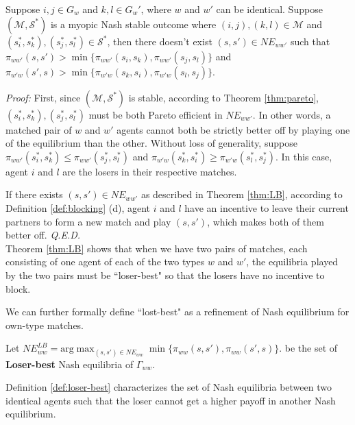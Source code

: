 \documentclass{myPaper}
\begin{document}
 \begin{theorem} \label{thm:LB}
Suppose $i, j\in G_w$ and $k, l \in G_w'$, where $w$ and $w'$ can be identical. Suppose $(\mathcal{M}, \mathcal{S}^*)$ is a myopic Nash stable outcome where $(i, j), (k, l) \in \mathcal{M}$ and $(s_i^*, s_k^*), (s_j^*, s_l^*) \in \mathcal{S}^*$, then there doesn't exist $(s, s')\in NE_{ww'}$ such that $\pi_{ww'}(s, s') > \min\{\pi_{ww'}(s_i, s_k), \pi_{ww'}(s_j, s_l)\}$ and $\pi_{w'w}(s', s) > \min\{\pi_{w'w}(s_k, s_i), \pi_{w'w}(s_l, s_j)\}$.
\end{theorem}
\noindent \textit{Proof:} First, since $(\mathcal{M}, \mathcal{S}^*)$ is stable, according to Theorem \ref{thm:pareto}, $(s_i^*, s_k^*), (s_j^*, s_l^*)$ must be both Pareto efficient in $NE_{ww'}$. In other words, a matched pair of $w$ and $w'$ agents cannot both be strictly better off by playing one of the equilibrium than the other.  Without loss of generality, suppose $\pi_{ww'}(s_i^*, s_k^*) \le \pi_{ww'}(s_j^*, s_l^*)$ and $\pi_{w'w}(s_k^*, s_i^*) \ge \pi_{w'w}(s_l^*, s_j^*)$. In this case, agent $i$ and $l$ are the losers in their respective matches. 

If there exists $(s, s') \in NE_{ww'}$ as described in Theorem \ref{thm:LB}, according to Definition \ref{def:blocking} (d), agent $i$ and $l$ have an incentive to leave their current partners to form a new match and play $(s, s')$, which makes both of them better off. \textit{Q.E.D.}
\\

Theorem \ref{thm:LB} shows that when we have two pairs of matches, each consisting of one agent of each of the two types $w$ and $w'$, the equilibria played by the two pairs must be ``loser-best" so that the losers have no incentive to block.

We can further formally define ``lost-best" as a refinement of Nash equilibrium for own-type matches. 

\begin{definition} \label{def:loser-best}
  Let $NE_{ww}^{LB}=\text{arg}\max_{(s, s')\in NE_{ww}} \min\{ \pi_{ww}(s, s'), \pi_{ww}(s', s)\}.$ be the set of \textbf{Loser-best} Nash equilibria of $\Gamma_{ww}$. 
\end{definition}

Definition \ref{def:loser-best} characterizes the set of Nash equilibria between two identical agents such that the loser cannot get a higher payoff in another Nash equilibrium.
\end{document}
